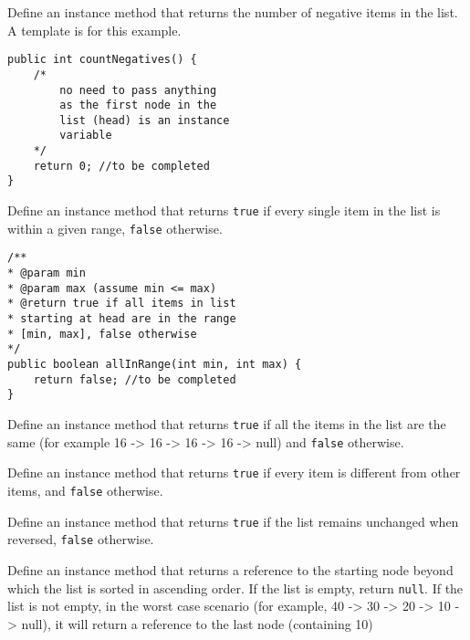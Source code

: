 \documentclass{exam}
\begin{document}
\begin{questions}
\question Define an instance method that returns the number of negative items in the list. A template is for this example.

\begin{lstlisting}
public int countNegatives() {
	/* 
		no need to pass anything
		as the first node in the 
		list (head) is an instance
		variable
	*/
	return 0; //to be completed
}
\end{lstlisting}

\question Define an instance method that returns \texttt{true} if every single item in the list is within a given range, \texttt{false} otherwise.

\begin{lstlisting}
/**
* @param min
* @param max (assume min <= max)
* @return true if all items in list
* starting at head are in the range
* [min, max], false otherwise
*/
public boolean allInRange(int min, int max) {
	return false; //to be completed
}
\end{lstlisting}

\question Define an instance method that returns \texttt{true} if all the items in the list are the same (for example 16 -> 16 -> 16 -> 16 -> null) and \texttt{false} otherwise.

\question Define an instance method that returns \texttt{true} if every item is different from other items, and \texttt{false} otherwise.

\question Define an instance method that returns \texttt{true} if the list remains unchanged when reversed, \texttt{false} otherwise.

\question Define an instance method that returns a reference to the starting node beyond which the list is sorted in ascending order. If the list is empty, return \texttt{null}. If the list is not empty, in the worst case scenario (for example, 40 -> 30 -> 20 -> 10 -> null), it will return a reference to the last node (containing 10)
\end{questions}
\end{document}

